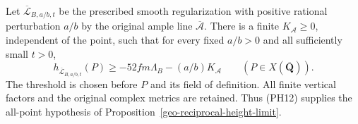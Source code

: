 \begin{theorem}
\label{thm:actual-all-point-height}
Let $\overline{\mathcal L}_{B,a/b,t}$ be the prescribed smooth
regularization with positive rational perturbation $a/b$ by the
original ample line $\overline{\mathcal A}$. There is a finite
$K_{\mathcal A}\ge0$, independent of the point, such that for
every fixed $a/b>0$ and all sufficiently small $t>0$,
\[
 h_{\overline{\mathcal L}_{B,a/b,t}}(P)
        \ge-52fm\Lambda_B-(a/b)K_{\mathcal A}
                  \qquad(P\in X(\overline{\mathbf Q})).
 \tag{PH12}
\]
The threshold is chosen before $P$ and its field of definition.
All finite vertical factors and the original complex metrics
are retained. Thus \textup{(PH12)} supplies the all-point
hypothesis of Proposition~\ref{geo-reciprocal-height-limit}.
\end{theorem}

